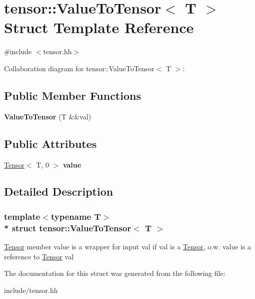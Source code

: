 \hypertarget{structtensor_1_1ValueToTensor}{}\section{tensor\+:\+:Value\+To\+Tensor$<$ T $>$ Struct Template Reference}
\label{structtensor_1_1ValueToTensor}


{\ttfamily \#include $<$tensor.\+hh$>$}



Collaboration diagram for tensor\+:\+:Value\+To\+Tensor$<$ T $>$\+:
\subsection*{Public Member Functions}
\begin{DoxyCompactItemize}
\item 
{\bfseries Value\+To\+Tensor} (T \&\&val)\hypertarget{structtensor_1_1ValueToTensor_ac347a9a4e1a37796449c3bd545d50063}{}\label{structtensor_1_1ValueToTensor_ac347a9a4e1a37796449c3bd545d50063}

\end{DoxyCompactItemize}
\subsection*{Public Attributes}
\begin{DoxyCompactItemize}
\item 
\hyperlink{classtensor_1_1Tensor}{Tensor}$<$ T, 0 $>$ {\bfseries value}\hypertarget{structtensor_1_1ValueToTensor_a7e173cf1794931779690f3a84bee3e20}{}\label{structtensor_1_1ValueToTensor_a7e173cf1794931779690f3a84bee3e20}

\end{DoxyCompactItemize}


\subsection{Detailed Description}
\subsubsection*{template$<$typename T$>$\\*
struct tensor\+::\+Value\+To\+Tensor$<$ T $>$}

\hyperlink{classtensor_1_1Tensor}{Tensor} member {\ttfamily value} is a wrapper for input {\ttfamily val} if val is a \hyperlink{classtensor_1_1Tensor}{Tensor}, o.\+w. {\ttfamily value} is a reference to \hyperlink{classtensor_1_1Tensor}{Tensor} {\ttfamily val} 

The documentation for this struct was generated from the following file\+:\begin{DoxyCompactItemize}
\item 
include/tensor.\+hh\end{DoxyCompactItemize}
